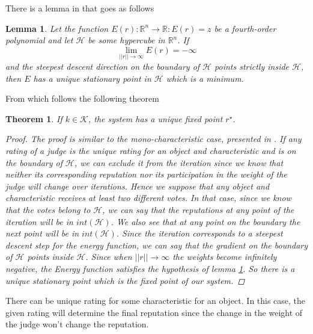 \documentclass[12pt,a4paper]{article}
\newtheorem{lemma}{Lemma}
\newtheorem{theorem}{Theorem}
\begin{document}
There is a lemma in \cite{Cristo1} that goes as follows
\begin{lemma}
Let the function $E(r) : \mathbb{R}^n \rightarrow \mathbb{R} : E(r) = z $ be a fourth-order polynomial and let $\mathcal{H}$ be some hypercube in $\mathbb{R}^n$. If 
$$\lim_{||r||\rightarrow \infty} E(r) = - \infty $$
and the steepest descent direction on the boundary of $\mathcal{H}$ points strictly inside $\mathcal{H}$, then $E$ has a unique stationary point in $\mathcal{H}$ which is a minimum.
\label{eq:poly}
\end{lemma}
From which follows the following theorem
\begin{theorem}
If $k \in \mathcal{K}$, the system has a unique fixed point $r^{\star}$.\label{thm:uni}
\begin{proof}
The proof is similar to the mono-characteristic case, presented in \cite{Cristo1}. If any rating of a judge is the unique rating for an object and characteristic and is on the boundary of $\mathcal{H}$, we can exclude it from the iteration since we know that neither its corresponding reputation nor its participation in the weight of the judge will change over iterations. Hence we suppose that any object and characteristic receives at least two different votes. In that case, since we know that the votes belong to $\mathcal{H}$, we can say that the reputations at any point of the iteration will be in $int(\mathcal{H})$.
We also see that at any point on the boundary the next point will be in $int(\mathcal{H})$. Since the iteration corresponds to a steepest descent step for the energy function, we can say that the gradient on the boundary of $\mathcal{H}$ points inside $\mathcal{H}$. Since when $||r|| \rightarrow \infty$ the weights become infinitely negative, the Energy function satisfies the hypothesis of lemma \ref{eq:poly}. So there is a unique stationary point which is the fixed point of our system.
\end{proof}

\end{theorem}
There can be unique rating for some characteristic for an object. In this case, the given rating will determine the final reputation since the change in the weight of the judge won't change the reputation.
\end{document}
